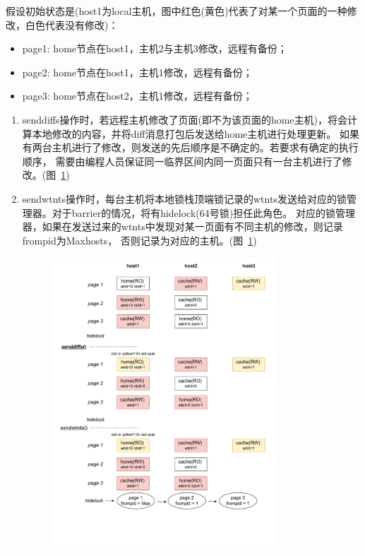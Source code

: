 {    假设初始状态是(host1为local主机，图中红色(黄色)代表了对某一个页面的一种修改，白色代表没有修改)：
    \begin{itemize}
        \item page1: home节点在host1，主机2与主机3修改，远程有备份；
        \item page2: home节点在host1，主机1修改，远程有备份；
        \item page3: home节点在host2，主机1修改，远程有备份；
    \end{itemize}
    \begin{enumerate}[label=\arabic*.]
        \item senddiffs操作时，若远程主机修改了页面(即不为该页面的home主机)，将会计算本地修改的内容，并将diff消息打包后发送给home主机进行处理更新。
              如果有两台主机进行了修改，则发送的先后顺序是不确定的。若要求有确定的执行顺序，
              需要由编程人员保证同一临界区间内同一页面只有一台主机进行了修改。(图~\ref{fig:JIAJIA-barrier1})
        \item sendwtnts操作时，每台主机将本地锁栈顶端锁记录的wtnts发送给对应的锁管理器。对于barrier的情况，将有hidelock(64号锁)担任此角色。
              对应的锁管理器，如果在发送过来的wtnts中发现对某一页面有不同主机的修改，则记录frompid为Maxhosts，
              否则记录为对应的主机。(图~\ref{fig:JIAJIA-barrier1})

              \newpage
              \begin{figure}[!htbp]
                  \centering
                  \includegraphics[width=0.8\textwidth,page=1]{Img/jiajia_barr_sync.drawio.pdf}
                  \label{fig:JIAJIA-barrier1}
              \end{figure}


\end{enumerate}}
